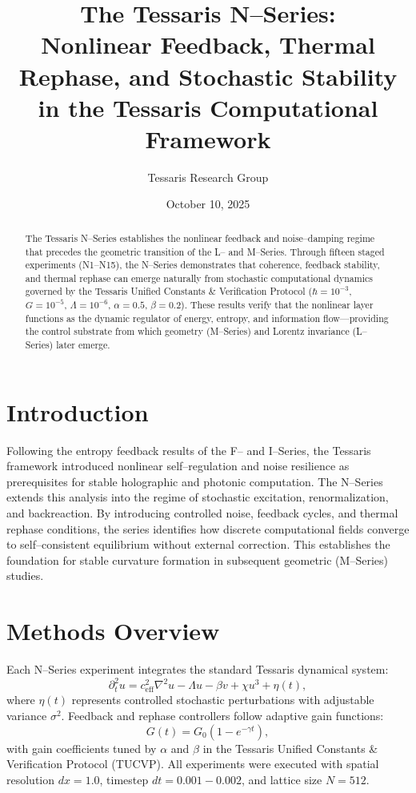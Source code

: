 \documentclass[11pt,a4paper]{article}
\title{\textbf{The Tessaris N--Series:\\Nonlinear Feedback, Thermal Rephase, and Stochastic Stability in the Tessaris Computational Framework}}
\author{Tessaris Research Group}
\date{October 10, 2025}
\begin{document}
\maketitle

\begin{abstract}
The Tessaris N--Series establishes the nonlinear feedback and noise--damping regime that precedes the geometric transition of the L-- and M--Series.
Through fifteen staged experiments (N1--N15), the N--Series demonstrates that coherence, feedback stability, and thermal rephase can emerge naturally from stochastic computational dynamics governed by the Tessaris Unified Constants \& Verification Protocol (\(\hbar{=}10^{-3}\), \(G{=}10^{-5}\), \(\Lambda{=}10^{-6}\), \(\alpha{=}0.5\), \(\beta{=}0.2\)).
These results verify that the nonlinear layer functions as the dynamic regulator of energy, entropy, and information flow—providing the control substrate from which geometry (M--Series) and Lorentz invariance (L--Series) later emerge.
\end{abstract}

\section{Introduction}
Following the entropy feedback results of the F-- and I--Series, the Tessaris framework introduced nonlinear self--regulation and noise resilience as prerequisites for stable holographic and photonic computation.
The N--Series extends this analysis into the regime of stochastic excitation, renormalization, and backreaction.
By introducing controlled noise, feedback cycles, and thermal rephase conditions, the series identifies how discrete computational fields converge to self--consistent equilibrium without external correction.
This establishes the foundation for stable curvature formation in subsequent geometric (M--Series) studies.

\section{Methods Overview}
Each N--Series experiment integrates the standard Tessaris dynamical system:
\[
\partial_t^2 u = c_{\text{eff}}^2 \nabla^2 u - \Lambda u - \beta v + \chi u^3 + \eta(t),
\]
where \(\eta(t)\) represents controlled stochastic perturbations with adjustable variance \(\sigma^2\).
Feedback and rephase controllers follow adaptive gain functions:
\[
G(t) = G_0 \left( 1 - e^{-\gamma t} \right),
\]
with gain coefficients tuned by \(\alpha\) and \(\beta\) in the Tessaris Unified Constants \& Verification Protocol (TUCVP).
All experiments were executed with spatial resolution \(dx{=}1.0\), timestep \(dt{=}0.001{-}0.002\), and lattice size \(N{=}512\).
\end{document}
